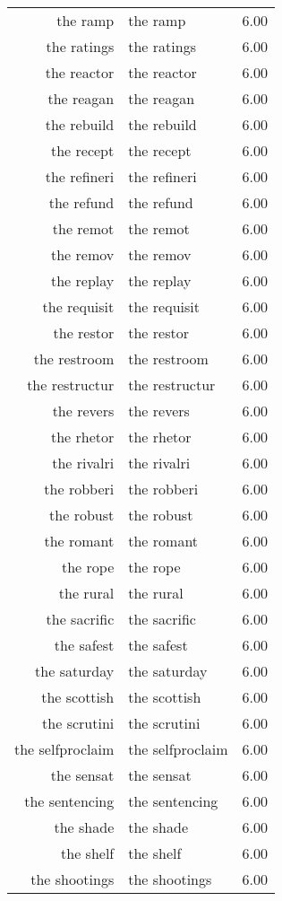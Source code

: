 \begin{table}[ht]
\begin{tabular}{rlr}
  the ramp & the ramp & 6.00 \\ 
  the ratings & the ratings & 6.00 \\ 
  the reactor & the reactor & 6.00 \\ 
  the reagan & the reagan & 6.00 \\ 
  the rebuild & the rebuild & 6.00 \\ 
  the recept & the recept & 6.00 \\ 
  the refineri & the refineri & 6.00 \\ 
  the refund & the refund & 6.00 \\ 
  the remot & the remot & 6.00 \\ 
  the remov & the remov & 6.00 \\ 
  the replay & the replay & 6.00 \\ 
  the requisit & the requisit & 6.00 \\ 
  the restor & the restor & 6.00 \\ 
  the restroom & the restroom & 6.00 \\ 
  the restructur & the restructur & 6.00 \\ 
  the revers & the revers & 6.00 \\ 
  the rhetor & the rhetor & 6.00 \\ 
  the rivalri & the rivalri & 6.00 \\ 
  the robberi & the robberi & 6.00 \\ 
  the robust & the robust & 6.00 \\ 
  the romant & the romant & 6.00 \\ 
  the rope & the rope & 6.00 \\ 
  the rural & the rural & 6.00 \\ 
  the sacrific & the sacrific & 6.00 \\ 
  the safest & the safest & 6.00 \\ 
  the saturday & the saturday & 6.00 \\ 
  the scottish & the scottish & 6.00 \\ 
  the scrutini & the scrutini & 6.00 \\ 
  the selfproclaim & the selfproclaim & 6.00 \\ 
  the sensat & the sensat & 6.00 \\ 
  the sentencing & the sentencing & 6.00 \\ 
  the shade & the shade & 6.00 \\ 
  the shelf & the shelf & 6.00 \\ 
  the shootings & the shootings & 6.00 \\ 

\end{tabular}
\end{table}
